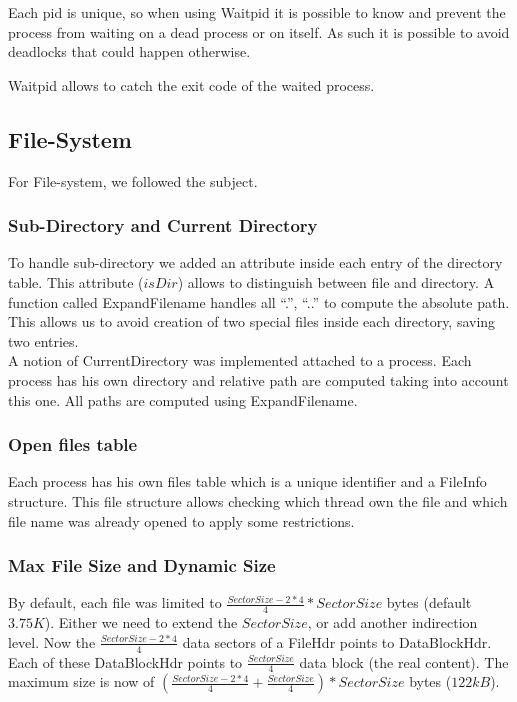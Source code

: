 Each pid is unique, so when using Waitpid it is possible to know and prevent the
process from waiting on a dead process or on itself. As such it is possible
to avoid deadlocks that could happen otherwise.

Waitpid allows to catch the exit code of the waited process.

\subsection{File-System}
For File-system, we followed the subject.

\subsubsection{Sub-Directory and Current Directory}

To handle sub-directory we added an attribute inside each entry of the directory
table. This attribute ($isDir$) allows to distinguish between file and
directory. A function called \textrm{ExpandFilename} handles all ``.'', ``..'' to
compute the absolute path. This allows us to avoid creation of two special files
inside each directory,
saving two entries.\\

A notion of CurrentDirectory was implemented attached to a process. Each process
has his own directory and relative path are computed taking into account this
one. All paths are computed using ExpandFilename.

\subsubsection{Open files table}
Each process has his own files table which is a unique identifier and a
FileInfo structure. This file structure allows checking which thread own the
file and which file name was already opened to apply some restrictions.

\subsubsection{Max File Size and Dynamic Size}
By default, each file was limited to $\frac{SectorSize - 2*4}{4} * SectorSize$
bytes (default $3.75K$). Either we need to extend the $SectorSize$, or add another
indirection level.
Now the $\frac{SectorSize - 2*4}{4}$ data sectors of a FileHdr points to
DataBlockHdr. Each of these DataBlockHdr points to $\frac{SectorSize}{4}$ data
block (the real content).
The maximum size is now of $(\frac{SectorSize - 2*4}{4} +
\frac{SectorSize}{4})*SectorSize$ bytes ($122kB$).\\

